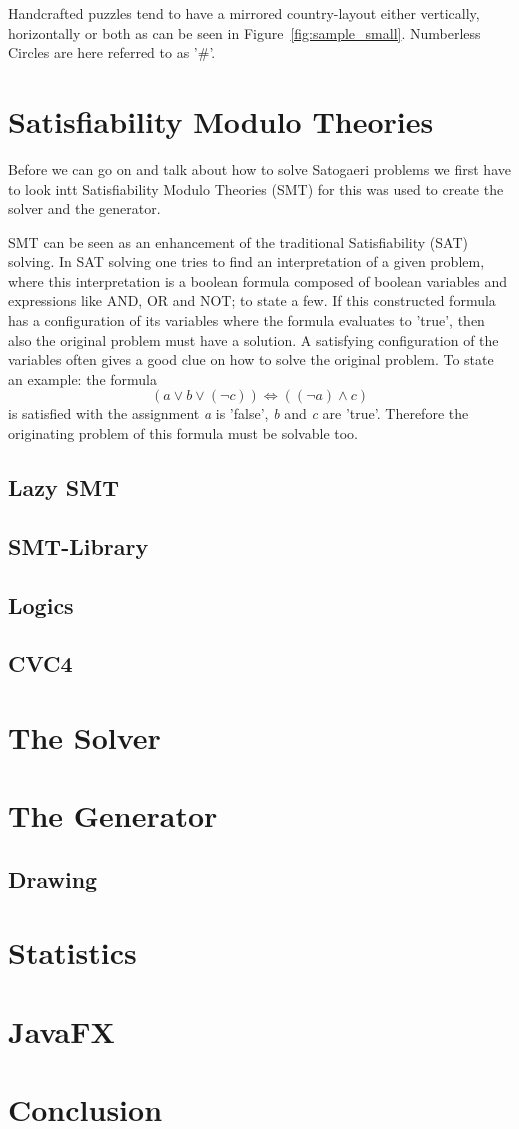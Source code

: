 \documentclass[a4paper,10pt]{paper}
\begin{document}
Handcrafted puzzles tend to have a mirrored country-layout either vertically, horizontally or both as can be seen in Figure~\ref{fig:sample_small}. Numberless Circles are here referred to as '\#'.

\section{Satisfiability Modulo Theories}
Before we can go on and talk about how to solve Satogaeri problems we first have to look intt Satisfiability Modulo Theories (SMT) for this was used to create the solver and the generator.

SMT can be seen as an enhancement of the traditional Satisfiability (SAT) solving. In SAT solving one tries to find an interpretation of a given problem, where this interpretation is a boolean formula composed of boolean variables and expressions like AND, OR and NOT; to state a few. If this constructed formula has a configuration of its variables where the formula evaluates to 'true', then also the original problem must have a solution. A satisfying configuration of the variables often gives a good clue on how to solve the original problem.
To state an example: the formula
\[(a \lor b \lor (\neg c)) \iff ((\neg a) \land c)\]
is satisfied with the assignment \textit{a} is 'false', \textit{b} and \textit{c} are 'true'. Therefore the originating problem of this formula must be solvable too.


\subsection{Lazy SMT}

\subsection{SMT-Library}

\subsection{Logics}

\subsection{CVC4}

\section{The Solver}

\section{The Generator}

\subsection{Drawing}

\section{Statistics}

\section{JavaFX}

\section{Conclusion}
\end{document}
